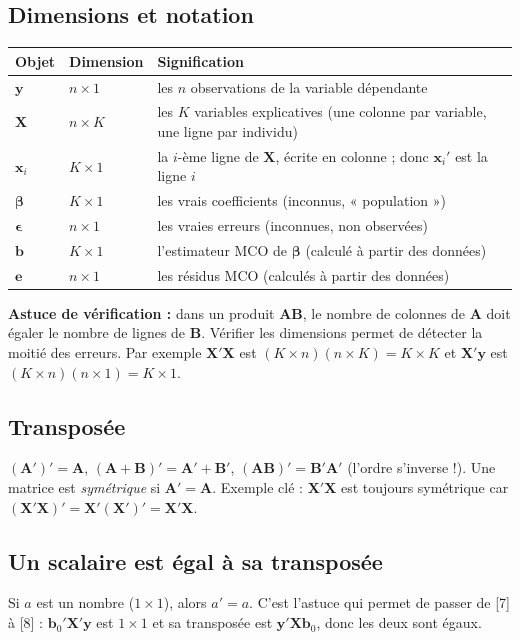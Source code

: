\documentclass[11pt,a4paper]{article}
\newcommand{\vy}{\mathbf{y}}
\newcommand{\vX}{\mathbf{X}}
\newcommand{\ve}{\mathbf{e}}
\newcommand{\vb}{\mathbf{b}}
\newcommand{\vx}{\mathbf{x}}
\newcommand{\vbeta}{\bm{\beta}}
\newcommand{\veps}{\bm{\epsilon}}
\newcommand{\A}{\mathbf{A}}
\newcommand{\XtX}{\vX'\vX}
\begin{document}
\subsection{Dimensions et notation}
\begin{center}
\begin{tabular}{@{}lll@{}}
\toprule
Objet & Dimension & Signification \\
\midrule
$\vy$ & $n\times 1$ & les $n$ observations de la variable dépendante \\
$\vX$ & $n\times K$ & les $K$ variables explicatives (une colonne par variable, une ligne par individu) \\
$\vx_i$ & $K\times 1$ & la $i$-ème ligne de $\vX$, écrite en colonne ; donc $\vx_i'$ est la ligne $i$ \\
$\vbeta$ & $K\times 1$ & les vrais coefficients (inconnus, « population ») \\
$\veps$ & $n\times 1$ & les vraies erreurs (inconnues, non observées) \\
$\vb$ & $K\times 1$ & l'estimateur MCO de $\vbeta$ (calculé à partir des données) \\
$\ve$ & $n\times 1$ & les résidus MCO (calculés à partir des données) \\
\bottomrule
\end{tabular}
\end{center}

\textbf{Astuce de vérification :} dans un produit $\A\mathbf{B}$, le nombre de colonnes de $\A$ doit égaler le nombre de lignes de $\mathbf{B}$. Vérifier les dimensions permet de détecter la moitié des erreurs. Par exemple $\XtX$ est $(K\times n)(n\times K)=K\times K$ et $\vX'\vy$ est $(K\times n)(n\times 1)=K\times 1$.

\subsection{Transposée}
$(\A')'=\A$, \quad $(\A+\mathbf{B})'=\A'+\mathbf{B}'$, \quad $(\A\mathbf{B})'=\mathbf{B}'\A'$ (l'ordre s'inverse !).
Une matrice est \emph{symétrique} si $\A'=\A$. Exemple clé : $\XtX$ est toujours symétrique car $(\XtX)'=\vX'(\vX')'=\XtX$.

\subsection{Un scalaire est égal à sa transposée}
Si $a$ est un nombre ($1\times1$), alors $a'=a$. C'est l'astuce qui permet de passer de [7] à [8] : $\vb_0'\vX'\vy$ est $1\times 1$ et sa transposée est $\vy'\vX\vb_0$, donc les deux sont égaux.
\end{document}
